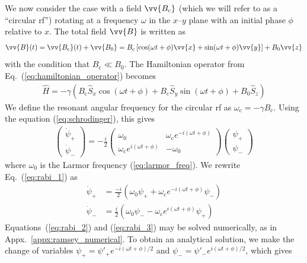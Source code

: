 We now consider the case with a field $\vv{B_\text{c}}$ (which we will refer to as a ``circular \acrshort{rf}'') rotating at a frequency $\omega$ in the $x$--$y$ plane with an initial phase $\phi$ relative to $x$. The total field $\vv{B}$ is written as
%
\begin{gather}
    \vv{B}(t)=\vv{B_\text{c}}(t) + \vv{B_0}=B_\text{c}\left[ \cos (\omega t + \phi) \vv{x} + \sin (\omega t + \phi) \vv{y}\right] + B_0 \vv{z}\label{eq:B0_with_circular_rf}
\end{gather}
%
with the condition that $B_\text{c} \ll B_0$. The Hamiltonian operator from Eq.~(\ref{eq:hamiltonian_operator}) becomes
%
\begin{gather}
    \hat{H} = -\gamma \left( B_\text{c} \hat{S}_x \cos (\omega t + \phi) + B_\text{c} \hat{S}_y  \sin (\omega t + \phi) + B_0\hat{S}_z \right)\label{eq:rabi_hamiltonian}
\end{gather}
%
We define the resonant angular frequency for the circular \acrshort*{rf} as $\omega_\text{c}=-\gamma B_\text{c}$. Using the \schrodinger equation (\ref{eq:schrodinger}), this gives
%
\begin{gather}
    \left(\begin{matrix}
        \dot{\psi}_+\\
        \dot{\psi}_-
    \end{matrix}\right)
    = -\frac{i}{2}
    \left(\begin{matrix}
        \omega_0 & \omega_\text{c}e^{-i(\omega t + \phi)}\\
        \omega_\text{c}e^{i(\omega t + \phi)} & -\omega_0
    \end{matrix} \right)
    \left(\begin{matrix}
        \psi_+\\
        \psi_-
    \end{matrix}\right)\label{eq:rabi_1}
\end{gather}
%
where $\omega_0$ is the Larmor frequency (\ref{eq:larmor_freq}). We rewrite Eq.~(\ref{eq:rabi_1}) as
%
\begin{align}
    \dot{\psi}_+ &=\frac{-i}{2}\left( \omega_0 \psi_+ + \omega_\text{c} e^{-i(\omega t + \phi)} \psi_- \right)\label{eq:rabi_2}\\
    \dot{\psi}_- &=\frac{i}{2}\left( \omega_0 \psi_- - \omega_\text{c} e^{i(\omega t + \phi)} \psi_+ \right)\label{eq:rabi_3}
\end{align}
%
Equations~(\ref{eq:rabi_2}) and (\ref{eq:rabi_3}) may be solved numerically, as in Appx.~\ref{appx:ramsey_numerical}. To obtain an analytical solution, we make the change of variables $\psi_+ = \psi'_+ e^{-i(\omega t + \phi)/2}$ and $\psi_- = \psi'_- e^{i(\omega t + \phi)/2}$, which gives
